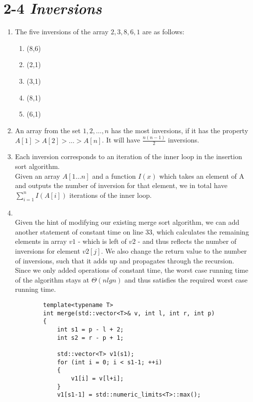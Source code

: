 \documentclass[11pt]{article}
\begin{document}
\section*{2-4 \textit{Inversions}}
\begin{enumerate}[label=\alph*)]
    \item
    The five inversions of the array ${2,3,8,6,1}$ are as follows:
        \begin{enumerate}
            \item (8,6)
            \item (2,1)
            \item (3,1)
            \item (8,1)
            \item (6,1)
        \end{enumerate}
    \item
        An array from the set ${1,2,\dots,n}$ has the most inversions, if it has the 
        property $A[1]>A[2]>\dots>A[n]$. It will have $\frac{n(n-1)}{2}$ inversions.
    \item
        Each inversion corresponds to an iteration of the inner loop in the insertion sort
        algorithm.\\
        Given an array $A[1\dots n]$ and a function $I(x)$ which takes an element of A
        and outputs the number of inversion for that element, we in total have 
        $\sum_{i=1}^{n} I(A[i])$ iterations of the inner loop.
     \item
         ~\\
        Given the hint of modifying our existing merge sort algorithm, we can 
        add another statement of constant time on line 33, which calculates the remaining
        elements in array $v1$ - which is left of $v2$ - and thus reflects the number
        of inversions for element $v2[j]$. We also change the return value to the number 
        of inversions, such that it adds up and propagates through the recursion. Since we 
        only added operations of constant time, the worst case running time of the algorithm stays at
        $\Theta (nlgn)$ and thus satisfies the required worst case running time.
        \begin{lstlisting}
        template<typename T>
        int merge(std::vector<T>& v, int l, int r, int p)
        {
            int s1 = p - l + 2;
            int s2 = r - p + 1;

            std::vector<T> v1(s1);
            for (int i = 0; i < s1-1; ++i)
            {
                v1[i] = v[l+i];
            }
            v1[s1-1] = std::numeric_limits<T>::max();


\end{lstlisting}
\end{enumerate}
\end{document}

